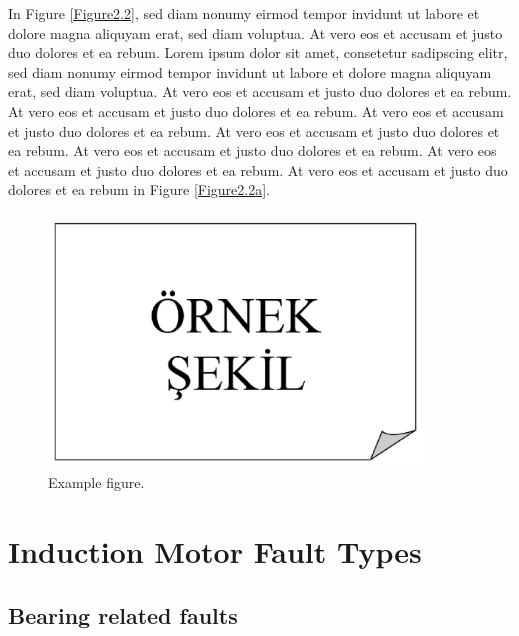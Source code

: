 
In Figure \ref{Figure2.2}, sed diam nonumy eirmod tempor invidunt ut labore et dolore magna aliquyam erat, sed diam voluptua. At vero eos et accusam et justo duo dolores et ea rebum. Lorem ipsum dolor sit amet, consetetur sadipscing elitr, sed diam nonumy eirmod tempor invidunt ut labore et dolore magna aliquyam erat, sed diam voluptua. At vero eos et accusam et justo duo dolores et ea rebum. At vero eos et accusam et justo duo dolores et ea rebum. At vero eos et accusam et justo duo dolores et ea rebum. At vero eos et accusam et justo duo dolores et ea rebum. At vero eos et accusam et justo duo dolores et ea rebum. At vero eos et accusam et justo duo dolores et ea rebum. At vero eos et accusam et justo duo dolores et ea rebum in Figure \ref{Figure2.2a}.

\begin{figure}
	\centering
	\includegraphics[width=10cm,keepaspectratio=true]{./fig/sekil2}
	\vspace{3pt}
	\caption{Example figure.}
	\label{Figure2.3}
\end{figure}
\vspace{-6pt}
\section{Induction Motor Fault Types}

\subsection{Bearing related faults}
